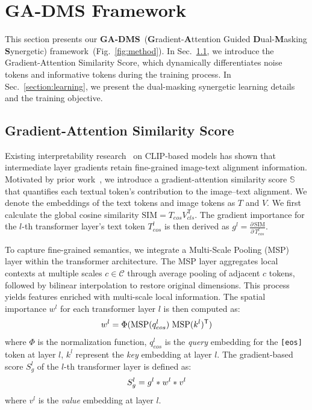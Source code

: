 
\section{GA-DMS Framework}
This section presents our \textbf{GA-DMS}~(\textbf{G}radient-\textbf{A}ttention Guided \textbf{D}ual-\textbf{M}asking \textbf{S}ynergetic) framework~(Fig.~\ref{fig:method}). In Sec.~\ref{section:importance}, we introduce the Gradient-Attention Similarity Score, which dynamically differentiates noise tokens and informative tokens during the training process. In Sec.~\ref{section:learning}, we present the dual-masking synergetic learning details and the training objective.

\subsection{Gradient-Attention Similarity Score}
\label{section:importance}
Existing interpretability research~\cite{selvaraju2017grad} on CLIP-based models has shown that intermediate layer gradients retain fine-grained image-text alignment information. Motivated by prior work~\cite{zhao2025gradeclip}, we introduce a gradient-attention similarity score $\mathbb{S}$ that quantifies each textual token’s contribution to the image–text alignment. We denote the embeddings of the text tokens and image tokens as $T$ and $V$. We first calculate the global cosine similarity $\mathrm{SIM} = T_{eos} V_{cls}^{\mathsf{T}}$. The gradient importance for the $l$-th transformer layer's text token $T_{eos}^l$ is then derived as $g^l= \tfrac{\partial\,\mathrm{SIM}}{\partial\,T_{eos}^l}$.

To capture fine-grained semantics, we integrate a Multi-Scale Pooling (MSP) layer within the transformer architecture. The MSP layer aggregates local contexts at multiple scales $c \in \mathcal{C}$ through average pooling of adjacent $c$ tokens, followed by bilinear interpolation to restore original dimensions. This process yields features enriched with multi-scale local information. The spatial importance $w^{l}$ for each transformer layer $l$ is then computed as:
\begin{equation}
\small
  w^l = \Phi(\mathrm{MSP}(q^l_{eos})\ \mathrm{MSP}(k^l)^{\mathsf{T}})
\end{equation}
where $\Phi$ is the normalization function, $q^l_{eos}$ is the \textit{query} embedding for the \texttt{[eos]} token at layer $l$, $k^l$ represent the \textit{key} embedding at layer $l$. The gradient-based score $S_g^{l}$ of the $l$-th transformer layer is defined as:
\begin{equation}
\small
S_g^l = g^l * w^l * v^l
\end{equation}
where $v^l$ is the \textit{value} embedding at layer $l$.

